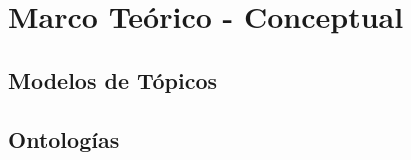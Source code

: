 \chapter{Marco Te\'orico - Conceptual}\label{chapter:state-of-the-art}

\section{Modelos de T\'opicos}

\section{Ontolog\'ias}
